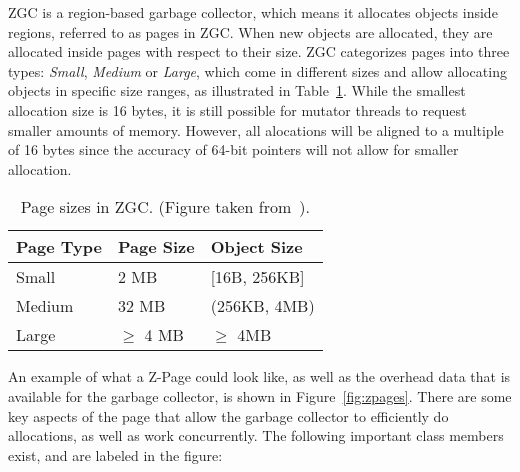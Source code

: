 ZGC is a region-based garbage collector, which means it allocates objects inside regions, referred to as pages in ZGC. When new objects are allocated, they are allocated inside pages with respect to their size. ZGC categorizes pages into three types: \textit{Small}, \textit{Medium} or \textit{Large}, which come in different sizes and allow allocating objects in specific size ranges, as illustrated in Table~\ref{table:zpage_sizes}. While the smallest allocation size is 16 bytes, it is still possible for mutator threads to request smaller amounts of memory. However, all alocations will be aligned to a multiple of 16 bytes since the accuracy of 64-bit pointers will not allow for smaller allocation.

\begin{table}[H]
    \centering
    \begin{tabular}{lllll}
        \hline
        Page Type & Page Size          & \multicolumn{3}{l}{Object Size}        \\ \hline
        Small     & 2 MB                & \multicolumn{3}{l}{{[}16B, 256KB{]}}   \\
        Medium    & 32 MB               & \multicolumn{3}{l}{(256KB, 4MB)}       \\
        Large     & $\geq$ 4 MB & \multicolumn{3}{l}{$\geq$ 4MB} \\ \hline
    \end{tabular}
    \caption{Page sizes in ZGC. (Figure taken from~\cite{zpage_size_table}). }
    \label{table:zpage_sizes}
\end{table}

An example of what a Z-Page could look like, as well as the overhead data that is available for the garbage collector, is shown in Figure~\ref{fig:zpages}. There are some key aspects of the page that allow the garbage collector to efficiently do allocations, as well as work concurrently. The following important class members exist, and are labeled in the figure:

